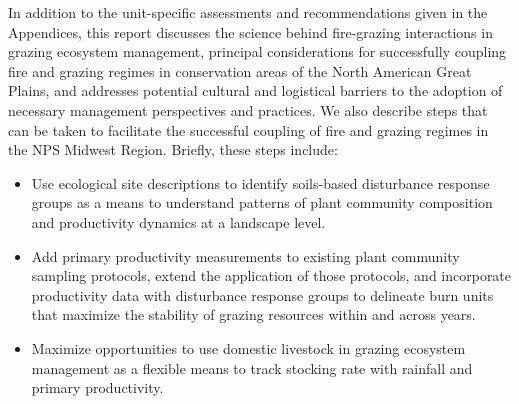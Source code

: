In addition to the unit-specific assessments and recommendations given in the Appendices, this report discusses the science behind fire-grazing interactions in grazing ecosystem management, principal considerations for successfully coupling fire and grazing regimes in conservation areas of the North American Great Plains, and addresses potential cultural and logistical barriers to the adoption of necessary management perspectives and practices. 
We also describe steps that can be taken to facilitate the successful coupling of fire and grazing regimes in the NPS Midwest Region. 
Briefly, these steps include: 
\begin{itemize}
	\item Use ecological site descriptions to identify soils-based disturbance response groups as a means to understand patterns of plant community composition and productivity dynamics at a landscape level. 
	\item Add primary productivity measurements to existing plant community sampling protocols, extend the application of those protocols, and incorporate productivity data with disturbance response groups to delineate burn units that maximize the stability of grazing resources within and across years.
	\item Maximize opportunities to use domestic livestock in grazing ecosystem management as a flexible means to track stocking rate with rainfall and primary productivity. 
\end{itemize} 


